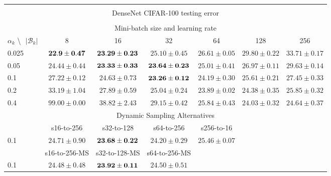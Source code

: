 \documentclass[10pt,journal,compsoc]{IEEEtran}
\begin{document}
\begin{table*}[!htbp]
\begin{center}
{\begin{tabular}{|l|c|c|c|c|c|c|}
\multicolumn{7}{|c|}{} \\
\multicolumn{7}{|c|}{DenseNet CIFAR-100 testing error} \\
\multicolumn{7}{|c|}{} \\
\hline
\multicolumn{7}{|c|}{Mini-batch size and learning rate} \\
\hline
$\alpha_k$ \textbackslash $ \text{   } {|\mathcal{B}_k|}$ & 8 & 16 & 32 & 64 & 128 & 256\\
\hline
0.025 &  $\bf 22.9\pm0.47$ & $\bf 23.29\pm0.23$ & $25.10\pm0.45$ & $26.61\pm0.05$ & $29.80\pm0.22$ & $33.71\pm0.17$  \\
\hline
0.05  & $24.44\pm0.44$ & $\bf 23.33\pm0.33$ & $\bf 23.64\pm0.23$ & $25.01\pm0.41$ & $26.97\pm0.11$ & $29.63\pm0.14$ \\
\hline
0.1   & $27.22\pm0.12$ & $24.63\pm0.73$ & $\bf 23.26\pm0.12$ & $24.19\pm0.30$ & $25.61\pm0.21$ & $27.45\pm0.33$  \\
\hline
0.2   & $33.19\pm1.04$ & $27.89\pm0.59$ & $25.04\pm0.24$ & $23.89\pm0.02$ & $24.38\pm0.35$ & $25.85\pm0.32$  \\
\hline
0.4   & $99.00\pm0.00$ & $38.82\pm2.43$ & $29.15\pm0.42$ & $25.84\pm0.43$ & $24.03\pm0.32$ & $24.64\pm0.37$  \\
\hline
\multicolumn{7}{|c|}{Dynamic Sampling Alternatives}\\
\hline
& s16-to-256  & s32-to-128 & s64-to-256 & s256-to-16 & & \\
\hline
0.1   & $24.71\pm0.90$ & $\bf 23.68\pm0.22$ & $24.20\pm0.29$ & $25.46\pm0.07$ & & \\
\hline
& s16-to-256-MS & s32-to-128-MS & s64-to-256-MS & 
& & \\
\hline
0.1 & $24.48\pm0.48$ & $\bf 23.92\pm0.11$ & $24.50\pm0.51$ & 
& & \\
\hline
\end{tabular}}
\end{center}
\end{table*}




\end{document}
